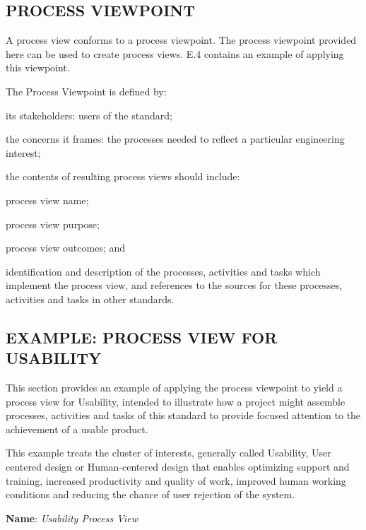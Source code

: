 	\subsection{PROCESS VIEWPOINT \label{subsubsec:process_viewpoint}}
	\begin{adjustwidth}{0.5em}{0pt}

		A process view conforms to a process viewpoint. The process viewpoint provided here can be used to create process views. E.4 contains an example of applying this viewpoint.
		
		The Process Viewpoint is defined by:

		\begin{compactitem}
			
			\item its stakeholders: users of the standard;

			\item the concerns it frames: the processes needed to reflect a particular engineering interest;

			\item the contents of resulting process views should include:

			\item process view name;

			\item process view purpose;

			\item process view outcomes; and

			\item identification and description of the processes, activities and tasks which implement the process view, and references to the sources for these processes, activities and tasks in other standards.

		\end{compactitem}

	\end{adjustwidth}


	\subsection{EXAMPLE: PROCESS VIEW FOR USABILITY \label{subsubsec:example_process_view_for_usability}}
	\begin{adjustwidth}{0.5em}{0pt}

		This section provides an example of applying the process viewpoint to yield a process view for Usability, intended to illustrate how a project might assemble processes, activities and tasks of this standard to provide focused attention to the achievement of a usable product.

		This example treats the cluster of interests, generally called Usability, User centered design or Human-centered design that enables optimizing support and training, increased productivity and quality of work, improved human working conditions and reducing the chance of user rejection of the system.

		{\bf Name}: {\it Usability Process View}

	\end{adjustwidth}

